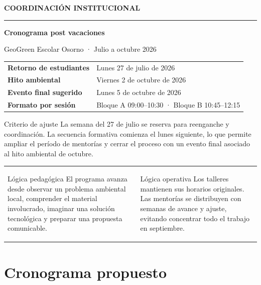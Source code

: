 \documentclass[10pt,a4paper]{article}
\newcommand{\eyebrow}[1]{%
  {\small\bfseries\textcolor{AIEPRed}{\MakeUppercase{#1}}}\par
  \vspace{8mm}
  {\color{AIEPRed}\rule{18mm}{0.8pt}}\par
  \vspace{10mm}
}
\begin{document}
\eyebrow{Coordinación institucional}

{\Huge\bfseries\color{AIEPNavy}Cronograma post vacaciones\par}
\vspace{3mm}
{\Large\color{AIEPMuted}GeoGreen Escolar Osorno · Julio a octubre 2026\par}

\vspace{9mm}
\begin{tabular}{@{}>{\bfseries\color{AIEPNavy}}l@{\hspace{8mm}}l@{}}
Retorno de estudiantes & Lunes 27 de julio de 2026 \\
Hito ambiental & Viernes 2 de octubre de 2026 \\
Evento final sugerido & Lunes 5 de octubre de 2026 \\
Formato por sesión & Bloque A 09:00--10:30 · Bloque B 10:45--12:15 \\
\end{tabular}

\vspace{8mm}
\begin{accentbox}{Criterio de ajuste}
La semana del 27 de julio se reserva para reenganche y coordinación. La secuencia formativa comienza el lunes siguiente, lo que permite ampliar el período de mentorías y cerrar el proceso con un evento final asociado al hito ambiental de octubre.
\end{accentbox}

\begin{tabularx}{\textwidth}{@{}Y Y@{}}
\begin{docbox}[height=34mm]{Lógica pedagógica}
El programa avanza desde observar un problema ambiental local, comprender el material involucrado, imaginar una solución tecnológica y preparar una propuesta comunicable.
\end{docbox}
&
\begin{docbox}[height=34mm]{Lógica operativa}
Los talleres mantienen sus horarios originales. Las mentorías se distribuyen con semanas de avance y ajuste, evitando concentrar todo el trabajo en septiembre.
\end{docbox}
\end{tabularx}

\newpage
\section{Cronograma propuesto}
\end{document}
